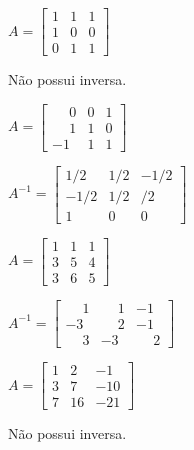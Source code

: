 \documentclass[12pt]{exam}
\begin{document}
\begin{exercicio}
    $
    A = \begin{bmatrix}
        1 & 1 & 1\\
        1 & 0 & 0\\
        0 & 1 & 1
    \end{bmatrix}
    $
    \begin{solucao}
        Não possui inversa.
    \end{solucao}
\end{exercicio}

\begin{exercicio}
    $
    A = \begin{bmatrix}
        \phantom{-}0 & 0 & 1\\
        \phantom{-}1 & 1 & 0\\
        -1 & 1 & 1
    \end{bmatrix}
    $
    \begin{solucao}
        $
            A^{-1} = \begin{bmatrix}
                1/2 & 1/2 & -1/2\\
                -1/2 & 1/2 & /2\\
                1 & 0 & 0
            \end{bmatrix}
        $
    \end{solucao}
\end{exercicio}


\begin{exercicio}
    $
        A =\begin{bmatrix}
            1 & 1 & 1\\
            3 & 5 & 4\\
            3 & 6 & 5
        \end{bmatrix}
    $
    \begin{solucao}
        $
            A^{-1} =\begin{bmatrix}
                \phantom{-} 1 & \phantom{-} 1 & -1\\
                -3 & \phantom{-} 2 & -1\\
                \phantom{-} 3 & -3 & \phantom{-} 2
            \end{bmatrix}
        $
    \end{solucao}
\end{exercicio}

\begin{exercicio}
  $
    A =\begin{bmatrix}
        1 & 2 & -1\\
        3 & 7 & -10\\
        7 & 16 & -21
    \end{bmatrix}
  $
  \begin{solucao}
    Não possui inversa.
  \end{solucao}
\end{exercicio}
\end{document}
